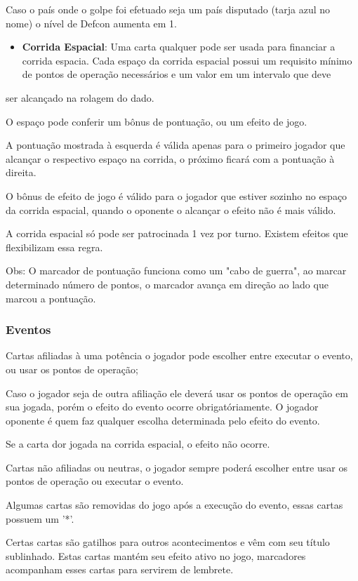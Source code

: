 \documentclass[11pt]{article}
\begin{document}
Caso o país onde o golpe foi efetuado seja um país disputado (tarja azul no nome) o nível de Defcon aumenta em 1.

\begin{itemize}
\item \textbf{Corrida Espacial}: Uma carta qualquer pode ser usada para financiar a corrida espacia. Cada espaço da corrida espacial possui um requisito mínimo de pontos de operação necessários e um valor em um intervalo que deve
\end{itemize}
ser alcançado na rolagem do dado.

O espaço pode conferir um bônus de pontuação, ou um efeito de jogo.

A pontuação mostrada à esquerda é válida apenas para o primeiro jogador que alcançar o respectivo espaço na corrida, o próximo ficará com a pontuação à direita.

O bônus de efeito de jogo é válido para o jogador que estiver sozinho no espaço da corrida espacial, quando o oponente o alcançar o efeito não é mais válido.

A corrida espacial só pode ser patrocinada 1 vez por turno. Existem efeitos que flexibilizam essa regra.

Obs: O marcador de pontuação funciona como um "cabo de guerra", ao marcar determinado número de pontos, o marcador avança em direção ao lado que marcou a pontuação.

\subsubsection{Eventos}
\label{sec:org51ec13b}

Cartas afiliadas à uma potência o jogador pode escolher entre executar o evento, ou usar os pontos de operação;

Caso o jogador seja de outra afiliação ele deverá usar os pontos de operação em sua jogada, porém o efeito do evento ocorre obrigatóriamente. O jogador oponente é quem faz qualquer escolha determinada pelo efeito do
evento.

Se a carta dor jogada na corrida espacial, o efeito não ocorre.

Cartas não afiliadas ou neutras, o jogador sempre poderá escolher entre usar os pontos de operação ou executar o evento.

Algumas cartas são removidas do jogo após a execução do evento, essas cartas possuem um '*'.

Certas cartas são gatilhos para outros acontecimentos e vêm com seu título sublinhado. Estas cartas mantém seu efeito ativo no jogo, marcadores acompanham esses cartas para servirem de lembrete.
\end{document}
